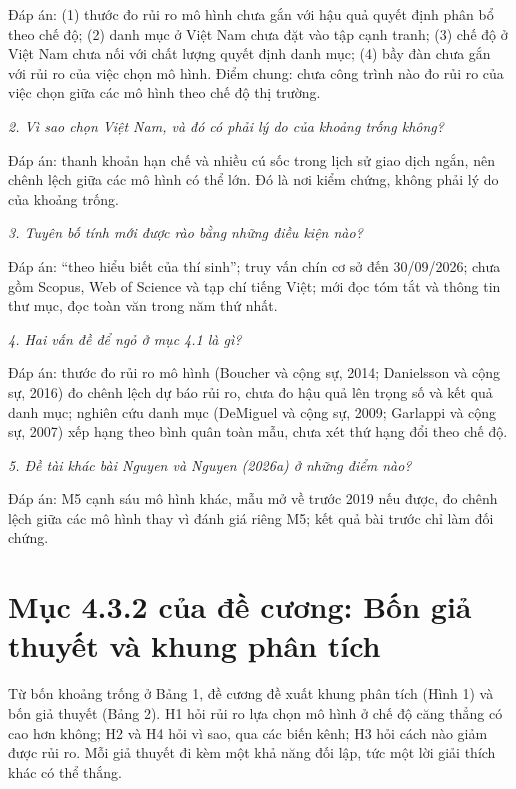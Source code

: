Đáp án: (1) thước đo rủi ro mô hình chưa gắn với hậu quả quyết định phân bổ theo chế độ; (2) danh mục ở Việt Nam chưa đặt vào tập cạnh tranh; (3) chế độ ở Việt Nam chưa nối với chất lượng quyết định danh mục; (4) bầy đàn chưa gắn với rủi ro của việc chọn mô hình. Điểm chung: chưa công trình nào đo rủi ro của việc chọn giữa các mô hình theo chế độ thị trường.

{\itshape 2. Vì sao chọn Việt Nam, và đó có phải lý do của khoảng trống không?\par}

Đáp án: thanh khoản hạn chế và nhiều cú sốc trong lịch sử giao dịch ngắn, nên chênh lệch giữa các mô hình có thể lớn. Đó là nơi kiểm chứng, không phải lý do của khoảng trống.

{\itshape 3. Tuyên bố tính mới được rào bằng những điều kiện nào?\par}

Đáp án: “theo hiểu biết của thí sinh”; truy vấn chín cơ sở đến 30/09/2026; chưa gồm Scopus, Web of Science và tạp chí tiếng Việt; mới đọc tóm tắt và thông tin thư mục, đọc toàn văn trong năm thứ nhất.

{\itshape 4. Hai vấn đề để ngỏ ở mục 4.1 là gì?\par}

Đáp án: thước đo rủi ro mô hình (Boucher và cộng sự, 2014; Danielsson và cộng sự, 2016) đo chênh lệch dự báo rủi ro, chưa đo hậu quả lên trọng số và kết quả danh mục; nghiên cứu danh mục (DeMiguel và cộng sự, 2009; Garlappi và cộng sự, 2007) xếp hạng theo bình quân toàn mẫu, chưa xét thứ hạng đổi theo chế độ.

{\itshape 5. Đề tài khác bài Nguyen và Nguyen (2026a) ở những điểm nào?\par}

Đáp án: M5 cạnh sáu mô hình khác, mẫu mở về trước 2019 nếu được, đo chênh lệch giữa các mô hình thay vì đánh giá riêng M5; kết quả bài trước chỉ làm đối chứng.

\chapter{Mục 4.3.2 của đề cương: Bốn giả thuyết và khung phân tích}

Từ bốn khoảng trống ở Bảng 1, đề cương đề xuất khung phân tích (Hình 1) và bốn giả thuyết (Bảng 2). H1 hỏi rủi ro lựa chọn mô hình ở chế độ căng thẳng có cao hơn không; H2 và H4 hỏi vì sao, qua các biến kênh; H3 hỏi cách nào giảm được rủi ro. Mỗi giả thuyết đi kèm một khả năng đối lập, tức một lời giải thích khác có thể thắng.

